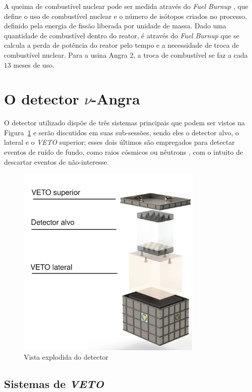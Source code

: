 A queima de combustível nuclear pode ser medida através do \emph{Fuel Burnup} \cite{fuelburnup}, que define o uso de combustível nuclear e o número de isótopos criados no processo, definido pela energia de fissão liberada por unidade de massa. Dado uma quantidade de combustível dentro do reator, é através do \emph{Fuel Burnup} que se calcula a perda de potência do reator pelo tempo e a necessidade de troca de combustível nuclear. Para a usina Angra 2, a troca de combustível se faz a cada $13$ meses de uso. \cite{eletronuclear}


\section{O detector $\nu$-Angra} \label{sec:detector}

O detector utilizado dispõe de três sistemas principais que podem ser vistos na Figura~\ref{fig:detector} e serão discutidos em suas sub-sessões, sendo eles o detector alvo, o  lateral e o \emph{VETO} superior; esses dois últimos são empregados para detectar eventos de ruído de fundo, como raios cósmicos ou nêutrons \cite{dion2019}, com o intuito de descartar eventos de não-interesse.

\begin{figure}[H]
    \centering
    \includegraphics[width=9cm]{textuais/experimento/figuras/detector.png}
    \caption{Vista explodida do detector}
    \label{fig:detector}
\end{figure}

\subsection{Sistemas de \emph{VETO}}

